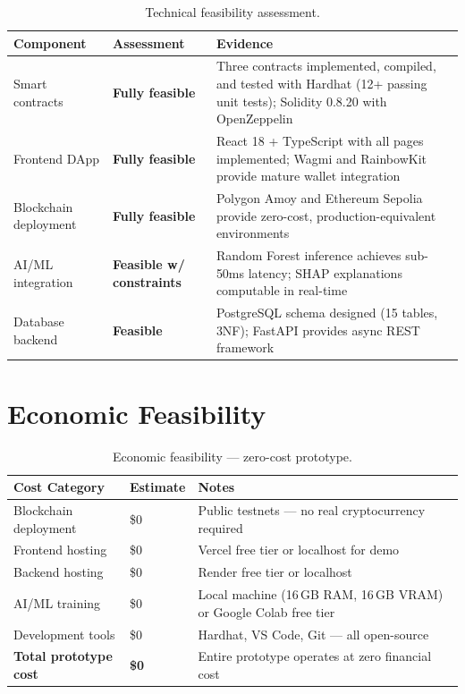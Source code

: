 \documentclass[12pt,a4paper]{report}
\newcommand{\tableheadfont}{\bfseries\small\color{PrimaryBlue}}
\newenvironment{moderntable}[1][H]{%
    \begin{table}[#1]\centering\small%
    \renewcommand{\arraystretch}{1.35}%
}{%
    \end{table}%
}
\begin{document}
\begin{moderntable}
\caption{Technical feasibility assessment.}
\begin{tabular}{@{} >{\raggedright}p{2.5cm} >{\raggedright}p{2.2cm} >{\raggedright\arraybackslash}p{7cm} @{}}
\toprule
\tableheadfont Component & \tableheadfont Assessment & \tableheadfont Evidence \\
\midrule
\rowcolor{RowShade}
Smart contracts & {\color{GreenAccent}\textbf{Fully feasible}} & Three contracts implemented, compiled, and tested with Hardhat (12+ passing unit tests); Solidity 0.8.20 with OpenZeppelin \\
Frontend DApp & {\color{GreenAccent}\textbf{Fully feasible}} & React 18 + TypeScript with all pages implemented; Wagmi and RainbowKit provide mature wallet integration \\
\rowcolor{RowShade}
Blockchain deployment & {\color{GreenAccent}\textbf{Fully feasible}} & Polygon Amoy and Ethereum Sepolia provide zero-cost, production-equivalent environments \\
AI/ML integration & {\color{AmberAccent}\textbf{Feasible w/ constraints}} & Random Forest inference achieves sub-50ms latency; SHAP explanations computable in real-time \\
\rowcolor{RowShade}
Database backend & {\color{GreenAccent}\textbf{Feasible}} & PostgreSQL schema designed (15 tables, 3NF); FastAPI provides async REST framework \\
\bottomrule
\end{tabular}
\end{moderntable}


\section{Economic Feasibility}

\begin{moderntable}
\caption{Economic feasibility --- zero-cost prototype.}
\begin{tabular}{@{} >{\raggedright}p{3.5cm} >{\raggedright}p{3cm} >{\raggedright\arraybackslash}p{5.5cm} @{}}
\toprule
\tableheadfont Cost Category & \tableheadfont Estimate & \tableheadfont Notes \\
\midrule
\rowcolor{RowShade}
Blockchain deployment & \$0 & Public testnets --- no real cryptocurrency required \\
Frontend hosting & \$0 & Vercel free tier or localhost for demo \\
\rowcolor{RowShade}
Backend hosting & \$0 & Render free tier or localhost \\
AI/ML training & \$0 & Local machine (16\,GB RAM, 16\,GB VRAM) or Google Colab free tier \\
\rowcolor{RowShade}
Development tools & \$0 & Hardhat, VS Code, Git --- all open-source \\
\textbf{Total prototype cost} & \textbf{\$0} & Entire prototype operates at zero financial cost \\
\bottomrule
\end{tabular}
\end{moderntable}
\end{document}
